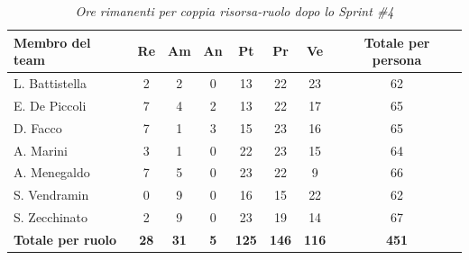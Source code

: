 \documentclass[a4paper, 10pt, colorlinks=true, linkcolor=black, urlcolor=blue, citecolor=blue, hidelinks]{article}
\renewcommand{\arraystretch}{1.2}
\begin{document}
\begin{table}[H]
    \centering
    \renewcommand{\arraystretch}{1.4}
    \begin{tabular}{|l|c|c|c|c|c|c|c|}
        \hline
        \rowcolor{bluBitless!15}
        \textbf{Membro del team} & \textbf{Re} & \textbf{Am} & \textbf{An} & \textbf{Pt} & \textbf{Pr} & \textbf{Ve} & \textbf{Totale per persona} \\
        \hline
        L. Battistella & 2 & 2 & 0 & 13 & 22 & 23 & 62 \\ \hline
        E. De Piccoli & 7 & 4 & 2 & 13 & 22 & 17 & 65 \\ \hline
        D. Facco & 7 & 1 & 3 & 15 & 23 & 16 & 65 \\ \hline
        A. Marini & 3 & 1 & 0 & 22 & 23 & 15 & 64 \\ \hline
        A. Menegaldo & 7 & 5 & 0 & 23 & 22 & 9 & 66 \\ \hline
        S. Vendramin & 0 & 9 & 0 & 16 & 15 & 22 & 62 \\ \hline
        S. Zecchinato & 2 & 9 & 0 & 23 & 19 & 14 & 67 \\ \hline
        \rowcolor{bluBitless!8}
        \textbf{Totale per ruolo} & \textbf{28} & \textbf{31} & \textbf{5} & \textbf{125} & \textbf{146} & \textbf{116} & \textbf{451} \\
        \hline
    \end{tabular}
    \caption{\textit{Ore rimanenti per coppia risorsa-ruolo dopo lo Sprint \#4}}
\end{table}
\end{document}
